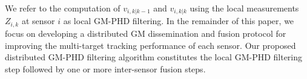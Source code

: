 We refer to the computation of $v_{i,k|k-1}$ and $v_{i,k|k}$ using the local measurements $Z_{i,k}$ at sensor $i$ as local GM-PHD filtering.
In the remainder of this paper, we focus on developing a distributed GM dissemination and fusion protocol for improving the multi-target tracking performance of each sensor. Our proposed distributed GM-PHD filtering algorithm constitutes the local GM-PHD filtering step followed by one or more inter-sensor fusion steps. 